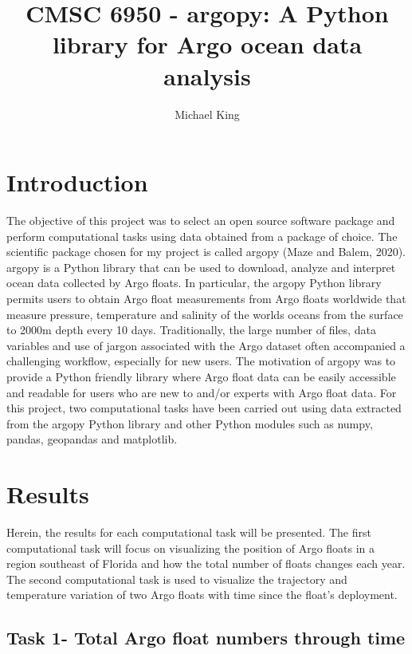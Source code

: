 \documentclass{article}
\title{CMSC 6950 - argopy: A Python library for Argo ocean data analysis}
\author{Michael King}
\begin{document}
\maketitle

\section{Introduction}

The objective of this project was to select an open source software package and perform computational tasks using data obtained from a package of choice. The scientific package chosen for my project is called argopy (Maze and Balem, 2020). argopy is a Python library that can be used to download, analyze and interpret ocean data collected by Argo floats. In particular, the argopy Python library permits users to obtain Argo float measurements from Argo floats worldwide that measure pressure, temperature and salinity of the worlds oceans from the surface to 2000m depth every 10 days. Traditionally, the large number of files, data variables and use of jargon associated with the Argo dataset often accompanied a challenging workflow, especially for new users. The motivation of argopy was to provide a Python friendly library where Argo float data can be easily accessible and readable for users who are new to and/or experts with Argo float data. For this project, two computational tasks have been carried out using data extracted from the argopy Python library and other Python modules such as numpy, pandas, geopandas and matplotlib. 

    

\section{Results}

Herein, the results for each computational task will be presented. The first computational task will focus on visualizing the position of Argo floats in a region southeast of Florida and how the total number of floats changes each year. The second computational task is used to visualize the trajectory and temperature variation of two Argo floats with time since the float's deployment.

\subsection{Task 1- Total Argo float numbers through time}
\end{document}
